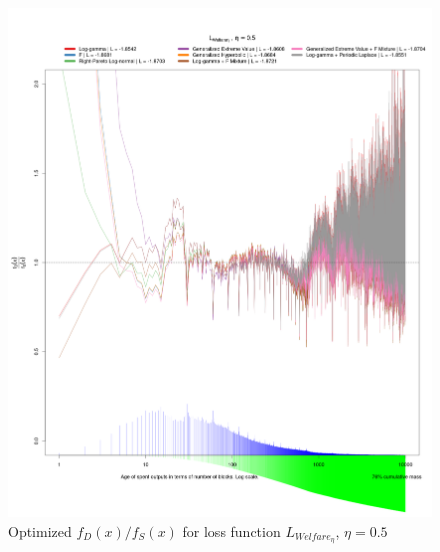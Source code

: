 \documentclass[english]{article}
\begin{document}
\begin{figure}
\caption{Optimized $f_{D}(x)/f_{S}(x)$ for loss function $L_{Welfare_{\eta}}$,
$\eta=0.5$}

\includegraphics[scale=0.35]{images/dry-run/estimate-div-target/estimate-div-target-L_Welfare-flavor-0.5}
\end{figure}
\end{document}
